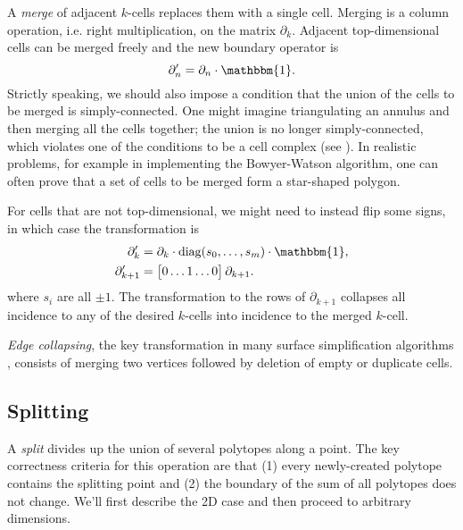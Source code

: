 \documentclass[twocolumn]{article}
\begin{document}
A \emph{merge} of adjacent $k$-cells replaces them with a single cell.
Merging is a column operation, i.e. right multiplication, on the matrix $\partial_k$.
Adjacent top-dimensional cells can be merged freely and the new boundary operator is
\begin{equation}
    \partial_n' = \partial_n\cdot\mathbbm{1}.
\end{equation}
Strictly speaking, we should also impose a condition that the union of the cells to be merged is simply-connected.
One might imagine triangulating an annulus and then merging all the cells together; the union is no longer simply-connected, which violates one of the conditions to be a cell complex (see \cite{hatcher2002algebraic}).
In realistic problems, for example in implementing the Bowyer-Watson algorithm, one can often prove that a set of cells to be merged form a star-shaped polygon.

For cells that are not top-dimensional, we might need to instead flip some signs, in which case the transformation is
\begin{align}
    \partial_k' & = \partial_k\cdot\text{diag}(s_0, \ldots, s_m)\cdot\mathbbm{1}, \\
    \partial_{k + 1}' & = \left[\begin{matrix} 0 \ldots 1 \ldots 0\end{matrix}\right]\partial_{k + 1}.
\end{align}
where $s_i$ are all $\pm 1$.
The transformation to the rows of $\partial_{k + 1}$ collapses all incidence to any of the desired $k$-cells into incidence to the merged $k$-cell.

\emph{Edge collapsing}, the key transformation in many surface simplification algorithms \cite{gueziec1995surface}, consists of merging two vertices followed by deletion of empty or duplicate cells.

\subsection{Splitting}

A \emph{split} divides up the union of several polytopes along a point.
The key correctness criteria for this operation are that (1) every newly-created polytope contains the splitting point and (2) the boundary of the sum of all polytopes does not change.
We'll first describe the 2D case and then proceed to arbitrary dimensions.
\end{document}
